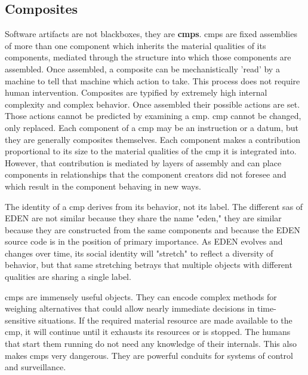 \documentclass[a4paper,man,natbib,floatsintext]{apa6}
\begin{document}
  \subsection{Composites}
  Software artifacts are not blackboxes, they are \textbf{\glspl{cmp}}. \Glspl{cmp} are fixed assemblies of more than one component which inherits the material qualities of its components, mediated through the structure into which those components are assembled. Once assembled, a composite can be mechanistically 'read' by a machine to tell that machine which action to take. This process does not require human intervention. Composites are typified by extremely high internal complexity and complex behavior. Once assembled their possible actions are set. Those actions cannot be predicted by examining a \gls{cmp}. \Gls{cmp} cannot be changed, only replaced. Each component of a \gls{cmp} may be an instruction or a datum, but they are generally composites themselves. Each component makes a contribution proportional to its size to the material qualities of the \gls{cmp} it is integrated into. However, that contribution is mediated by layers of assembly and can place components in relationships that the component creators did not foresee and which result in the component behaving in new ways.

  The identity of a \gls{cmp} derives from its behavior, not its label. The different \glspl{sa} of \gls{EDEN} are not similar because they share the name "eden," they are similar because they are constructed from the same components and because the \gls{EDEN} source code is in the position of primary importance. As \gls{EDEN} evolves and changes over time, its social identity will "stretch" to reflect a diversity of behavior, but that same stretching betrays that multiple objects with different qualities are sharing a single label. 

  \Glspl{cmp} are immensely useful objects. They can encode complex methods for weighing alternatives that could allow nearly immediate decisions in time-sensitive situations. If the required material resource are made available to the \gls{cmp}, it will continue until it exhausts its resources or is stopped. The humans that start them running do not need any knowledge of their internals. This also makes \glspl{cmp} very dangerous. They are powerful conduits for systems of control and surveillance. 
\end{document}
